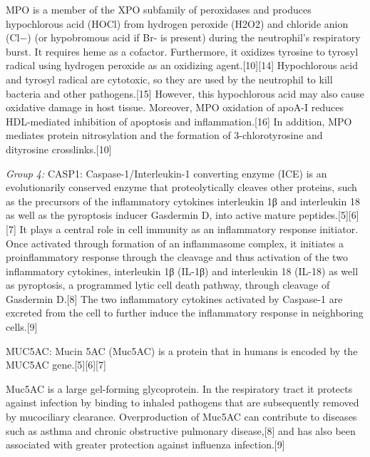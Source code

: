 \documentclass[
]{article}
\begin{document}
MPO is a member of the XPO subfamily of peroxidases and produces
hypochlorous acid (HOCl) from hydrogen peroxide (H2O2) and chloride
anion (Cl−) (or hypobromous acid if Br- is present) during the
neutrophil's respiratory burst. It requires heme as a cofactor.
Furthermore, it oxidizes tyrosine to tyrosyl radical using hydrogen
peroxide as an oxidizing agent.{[}10{]}{[}14{]} Hypochlorous acid and
tyrosyl radical are cytotoxic, so they are used by the neutrophil to
kill bacteria and other pathogens.{[}15{]} However, this hypochlorous
acid may also cause oxidative damage in host tissue. Moreover, MPO
oxidation of apoA-I reduces HDL-mediated inhibition of apoptosis and
inflammation.{[}16{]} In addition, MPO mediates protein nitrosylation
and the formation of 3-chlorotyrosine and dityrosine crosslinks.{[}10{]}

\emph{Group 4:} CASP1: Caspase-1/Interleukin-1 converting enzyme (ICE)
is an evolutionarily conserved enzyme that proteolytically cleaves other
proteins, such as the precursors of the inflammatory cytokines
interleukin 1β and interleukin 18 as well as the pyroptosis inducer
Gasdermin D, into active mature peptides.{[}5{]}{[}6{]}{[}7{]} It plays
a central role in cell immunity as an inflammatory response initiator.
Once activated through formation of an inflammasome complex, it
initiates a proinflammatory response through the cleavage and thus
activation of the two inflammatory cytokines, interleukin 1β (IL-1β) and
interleukin 18 (IL-18) as well as pyroptosis, a programmed lytic cell
death pathway, through cleavage of Gasdermin D.{[}8{]} The two
inflammatory cytokines activated by Caspase-1 are excreted from the cell
to further induce the inflammatory response in neighboring cells.{[}9{]}

MUC5AC: Mucin 5AC (Muc5AC) is a protein that in humans is encoded by the
MUC5AC gene.{[}5{]}{[}6{]}{[}7{]}

Muc5AC is a large gel-forming glycoprotein. In the respiratory tract it
protects against infection by binding to inhaled pathogens that are
subsequently removed by mucociliary clearance. Overproduction of Muc5AC
can contribute to diseases such as asthma and chronic obstructive
pulmonary disease,{[}8{]} and has also been associated with greater
protection against influenza infection.{[}9{]}
\end{document}
